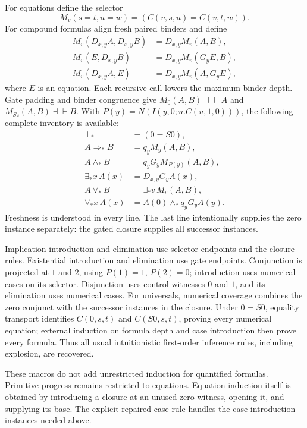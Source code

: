 For equations define the selector
\[
 M_v(s=t,u=w)=(C(v,s,u)=C(v,t,w)).
\]
For compound formulas align fresh paired binders and define
\[
 \begin{aligned}
 M_v(D_{x,y}A,D_{x,y}B)&=D_{x,y}M_v(A,B),\\
 M_v(E,D_{x,y}B)&=D_{x,y}M_v(G_yE,B),\\
 M_v(D_{x,y}A,E)&=D_{x,y}M_v(A,G_yE),
 \end{aligned}
\]
where $E$ is an equation. Each recursive call lowers the maximum binder
depth. Gate padding and binder congruence give
$M_0(A,B)\dashv\vdash A$ and $M_{Sz}(A,B)\dashv\vdash B$.
With $P(y)=N(I(y,0;u.C(u,1,0)))$, the following complete inventory is
available:
\[
\begin{aligned}
 \bot_*&=(0=S0),\\
 A\Rightarrow_*B&=q_yM_y(A,B),\\
 A\wedge_*B&=q_yG_yM_{P(y)}(A,B),\\
 \exists_*x\,A(x)&=D_{x,y}G_yA(x),\\
 A\vee_*B&=\exists_*v\,M_v(A,B),\\
 \forall_*x\,A(x)&=A(0)\wedge_*q_yG_yA(y).
\end{aligned}
\tag{Logical macros}
\]
Freshness is understood in every line. The last line intentionally
supplies the zero instance separately: the gated closure supplies all
successor instances.

Implication introduction and elimination use selector endpoints and the
closure rules. Existential introduction and elimination use gate
endpoints. Conjunction is projected at $1$ and $2$, using $P(1)=1$,
$P(2)=0$; introduction uses numerical cases on its selector. Disjunction
uses control witnesses $0$ and $1$, and its elimination uses numerical
cases. For universals, numerical coverage combines the zero conjunct
with the successor instances in the closure. Under $0=S0$, equality
transport identifies $C(0,s,t)$ and $C(S0,s,t)$, proving every numerical
equation; external induction on formula depth and case introduction
then prove every formula. Thus all usual intuitionistic first-order
inference rules, including explosion, are recovered.

These macros do not add unrestricted induction for quantified formulas.
Primitive progress remains restricted to equations. Equation induction itself is obtained
by introducing a closure at an unused zero witness, opening it, and
supplying its base. The explicit repaired case rule handles the case
introduction instances needed above.

